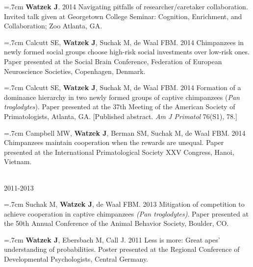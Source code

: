 \documentclass[]{friggeri-cv}
\begin{document}
\hangindent=.7cm \textbf{Watzek J}. 2014 Navigating pitfalls of researcher/caretaker collaboration. Invited talk given at Georgetown College Seminar: Cognition, Enrichment, and Collaboration; Zoo Atlanta, GA.

\hangindent=.7cm Calcutt SE, \textbf{Watzek J}, Suchak M, de Waal FBM. 2014 Chimpanzees in newly formed social groups choose high-risk social investments over low-risk ones. Paper presented at the Social Brain Conference, Federation of European Neuroscience Societies, Copenhagen, Denmark.

\hangindent=.7cm Calcutt SE, \textbf{Watzek J}, Suchak M, de Waal FBM. 2014 Formation of a dominance hierarchy in two newly formed groups of captive chimpanzees (\emph{Pan troglodytes}). Paper presented at the 37th Meeting of the American Society of Primatologists, Atlanta, GA. [Published abstract. \emph{Am J Primatol} 76(S1), 78.]

\hangindent=.7cm Campbell MW, \textbf{Watzek J}, Berman SM, Suchak M, de Waal FBM. 2014 Chimpanzees maintain cooperation when the rewards are unequal. Paper presented at the International Primatological Society XXV Congress, Hanoi, Vietnam.


{\large{} ~\\[-.15cm] 2011-2013}

\hangindent=.7cm Suchak M, \textbf{Watzek J}, de Waal FBM. 2013 Mitigation of competition to achieve cooperation in captive chimpanzees \emph{(Pan troglodytes)}. Paper presented at the 50th Annual Conference of the Animal Behavior Society, Boulder, CO.

\hangindent=.7cm \textbf{Watzek J}, Ebersbach M, Call J. 2011 Less is more: Great apes' understanding of probabilities. Poster presented at the Regional Conference of Developmental Psychologists, Central Germany.\\[-.1cm]


\renewenvironment{aside}{%
  \let\oldsection\section
  \renewcommand{\section}[1]{
    \par\vspace{\baselineskip}{\Large\headingfont\color{headercolor} ##1}
  }
  \begin{textblock}{3.6}(1.5, 1.5)
  \begin{flushright}
  \obeycr
}{%
  \restorecr
  \end{flushright}
  \end{textblock}
  \let\section\oldsection
}
\end{document}
